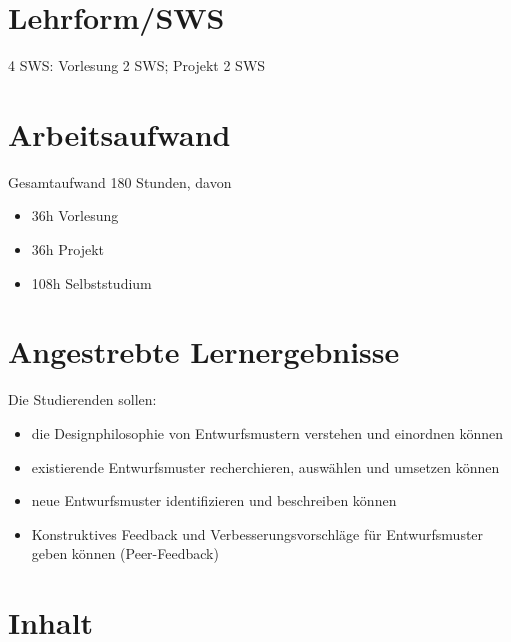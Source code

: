 \section*{Lehrform/SWS\label{/mi-2017/modulbeschreibungen-master/MA_SC_Soziotechnische_Entwurfsmuster}}\label{lehrformswspathlabelmi-2017modulbeschreibungen-mastermaux5fscux5fsoziotechnischeux5fentwurfsmuster}

4 SWS: Vorlesung 2 SWS; Projekt 2 SWS

\section*{Arbeitsaufwand\label{/mi-2017/modulbeschreibungen-master/MA_SC_Soziotechnische_Entwurfsmuster}}\label{arbeitsaufwandpathlabelmi-2017modulbeschreibungen-mastermaux5fscux5fsoziotechnischeux5fentwurfsmuster}

Gesamtaufwand 180 Stunden, davon

\begin{itemize}
\tightlist
\item
  36h Vorlesung
\item
  36h Projekt
\item
  108h Selbststudium
\end{itemize}

\section*{Angestrebte
Lernergebnisse\label{/mi-2017/modulbeschreibungen-master/MA_SC_Soziotechnische_Entwurfsmuster}}\label{angestrebte-lernergebnissepathlabelmi-2017modulbeschreibungen-mastermaux5fscux5fsoziotechnischeux5fentwurfsmuster}

Die Studierenden sollen:

\begin{itemize}
\tightlist
\item
  die Designphilosophie von Entwurfsmustern verstehen und einordnen
  können
\item
  existierende Entwurfsmuster recherchieren, auswählen und umsetzen
  können
\item
  neue Entwurfsmuster identifizieren und beschreiben können
\item
  Konstruktives Feedback und Verbesserungsvorschläge für Entwurfsmuster
  geben können (Peer-Feedback)
\end{itemize}

\section*{Inhalt\label{/mi-2017/modulbeschreibungen-master/MA_SC_Soziotechnische_Entwurfsmuster}}\label{inhaltpathlabelmi-2017modulbeschreibungen-mastermaux5fscux5fsoziotechnischeux5fentwurfsmuster}

